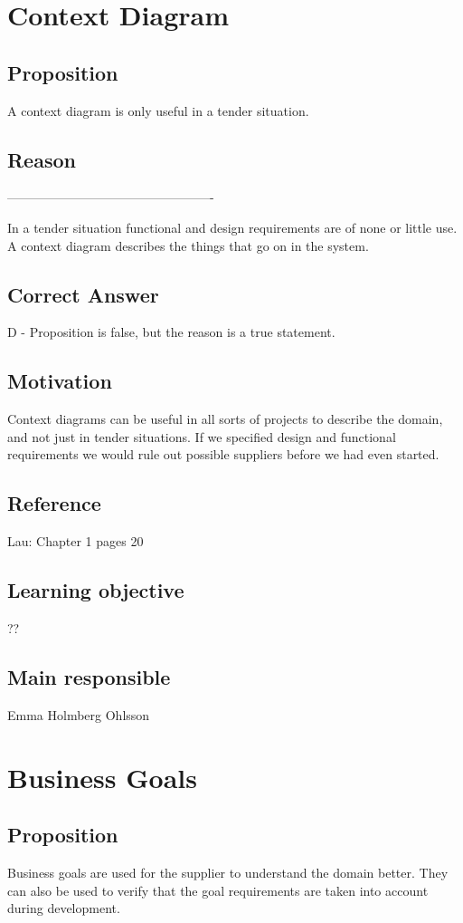 \documentclass[a4paper]{article}
\begin{document}
\section{Context Diagram}
\subsection*{Proposition}
A context diagram is only useful in a tender situation.
\subsection*{Reason}
-------------------------------------------------


In a tender situation functional and design requirements are of none or little use. A context diagram describes the things that go on in the system.
\subsection*{Correct Answer}
D - Proposition is false, but the reason is a true statement.
\subsection*{Motivation}
Context diagrams can be useful in all sorts of projects to describe the domain, and not just in tender situations. If we specified design and functional requirements we would rule out possible suppliers before we had even started.

\subsection*{Reference}
Lau: Chapter 1 pages 20
\subsection*{Learning objective}
??
\subsection*{Main responsible}
Emma Holmberg Ohlsson



\section{Business Goals}
\subsection*{Proposition}
Business goals are used for the supplier to understand the domain better. They can also be used to verify that the goal requirements are taken into account during development.
\end{document}
